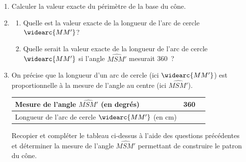 \begin{enumerate}
\item Calculer la valeur exacte du périmètre de la base du cône.
\item 
  \begin{enumerate}
  \item Quelle est la valeur exacte de la longueur de l'arc de cercle
    $\widearc{MM'}$?
  \item Quelle serait la valeur exacte de la longueur de l'arc de
    cercle $\widearc{MM'}$ si l'angle $\widehat{MSM'}$ mesurait
    360\degres\ ?
  \end{enumerate}
\item On précise que la longueur d'un arc de cercle (ici
  $\widearc{MM'}$) est proportionnelle à la mesure de l'angle au
  centre (ici $\widehat{MSM'}$).\\
  \begin{center}
    \begin{tabular}{|l|c|c|}
      \hline
      Mesure de l'angle $\widehat{MSM'}$ (en degrés)& 360 & \phantom{216}\\
      \hline
      Longueur de l'arc de cercle $\widearc{MM'}$ (en cm) &&\\
      \hline
    \end{tabular}
  \end{center}
  Recopier et compléter le tableau ci-dessus à l'aide des questions
  précédentes et déterminer la mesure de l'angle $\widehat{MSM'}$
  permettant de construire le patron du cône.
\end{enumerate}